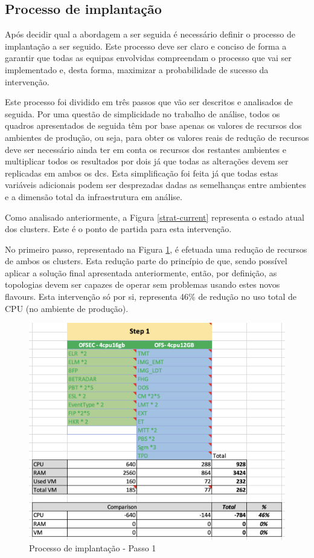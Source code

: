 \subsection{Processo de implantação}

Após decidir qual a abordagem a ser seguida é necessário definir o processo de implantação a ser
seguido. Este processo deve ser claro e conciso de forma a garantir que todas as equipas envolvidas
compreendam o processo que vai ser implementado e, desta forma, maximizar a probabilidade de
sucesso da intervenção. 

Este processo foi dividido em três passos que vão ser descritos e analisados de seguida. Por uma
questão de simplicidade no trabalho de análise, todos os quadros apresentados de seguida têm por 
base apenas os valores de recursos dos ambientes de produção, ou seja, para obter os valores reais
de redução de recursos deve ser necessário ainda ter em conta os recursos dos restantes ambientes
e multiplicar todos os resultados por dois já que todas as alterações devem ser replicadas em 
ambos os \glspl{dc}. Esta simplificação foi feita já que todas estas variáveis adicionais podem 
ser desprezadas dadas as semelhanças entre ambientes e a dimensão total da infraestrutura em
análise.

Como analisado anteriormente, a Figura \ref{strat-current} representa o estado atual dos 
\glspl{cluster}. Este é o ponto de partida para esta intervenção. 

No primeiro passo, representado na Figura \ref{strat-1}, é efetuada uma redução de recursos 
de ambos os \glspl{cluster}. Esta redução parte do princípio de que, sendo possível aplicar a 
solução final apresentada anteriormente, então, por definição, as topologias devem ser capazes de
operar sem problemas usando estes novos \glspl{flavour}. Esta intervenção só por si, representa
46\% de redução no uso total de \ac{CPU} (no ambiente de produção).

\begin{figure}[H]
  \centerline{\includegraphics[scale=0.5]{media/content/analise/strat-1.png}}
  \caption{Processo de implantação - Passo 1}
  \label{strat-1}
\end{figure}

